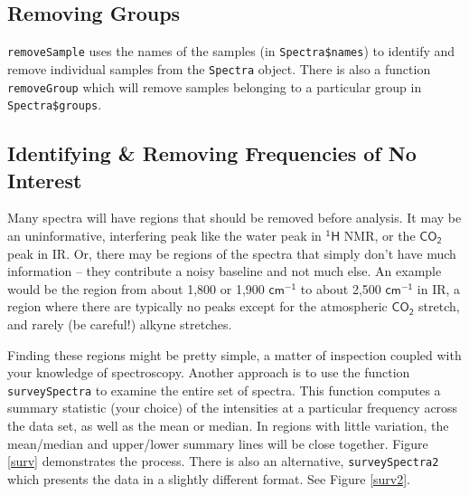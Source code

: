 \documentclass[letter,10pt,twocolumn,twoside,printwatermark=false]{pinp}
\begin{document}
\hypertarget{removing-groups}{%
\subsection{Removing Groups}\label{removing-groups}}

\texttt{removeSample} uses the names of the samples (in
\texttt{Spectra\$names}) to identify and remove individual samples from
the \texttt{Spectra} object. There is also a function
\texttt{removeGroup} which will remove samples belonging to a particular
group in \texttt{Spectra\$groups}.

\hypertarget{identifying-removing-frequencies-of-no-interest}{%
\subsection{Identifying \& Removing Frequencies of No
Interest}\label{identifying-removing-frequencies-of-no-interest}}

Many spectra will have regions that should be removed before analysis.
It may be an uninformative, interfering peak like the water peak in
\(\mathsf{^{1}H}\) NMR, or the \(\mathsf{CO_2}\) peak in IR. Or, there
may be regions of the spectra that simply don't have much information --
they contribute a noisy baseline and not much else. An example would be
the region from about 1,800 or 1,900 \(\mathsf{cm^{-1}}\) to about 2,500
\(\mathsf{cm^{-1}}\) in IR, a region where there are typically no peaks
except for the atmospheric \(\mathsf{CO_2}\) stretch, and rarely (be
careful!) alkyne stretches.

Finding these regions might be pretty simple, a matter of inspection
coupled with your knowledge of spectroscopy. Another approach is to use
the function \texttt{surveySpectra} to examine the entire set of
spectra. This function computes a summary statistic (your choice) of the
intensities at a particular frequency across the data set, as well as
the mean or median. In regions with little variation, the mean/median
and upper/lower summary lines will be close together. Figure \ref{surv}
demonstrates the process. There is also an alternative,
\texttt{surveySpectra2} which presents the data in a slightly different
format. See Figure \ref{surv2}.

\begin{Shaded}
\begin{Highlighting}[]
   \NormalTok{,}
   \NormalTok{)}
\end{Highlighting}
\end{Shaded}
\end{document}
